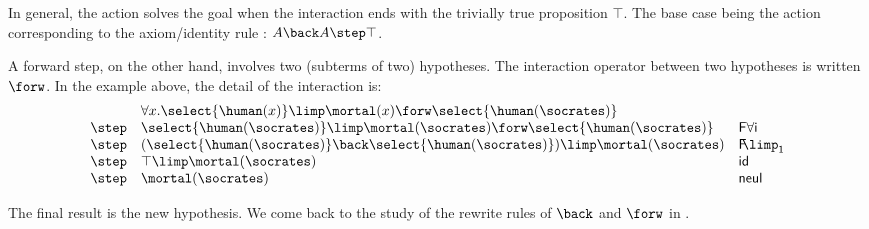 In general, the action solves the goal when the interaction ends with
the trivially true proposition $\top$. The base case being the action
corresponding to the axiom/identity rule : $A\back A \step\top$.

A forward step, on the other hand, involves two (subterms of two)
hypotheses. The interaction operator between two hypotheses is written
$\forw$. In the example above, the detail of the interaction is:
$$
  \begin{array}{lll}
    &  \forall x .\select{\human(x)}\limp\mortal(x) \forw \select{\human(\socrates)}&\\
    \step & \select{\human(\socrates)}\limp\mortal(\socrates) \forw \select{\human(\socrates)}& \mathsf{F \forall i}\\
    \step & (\select{\human(\socrates)}\back \select{\human(\socrates)} )\limp\mortal(\socrates) &\mathsf{F\!\!\limp_1}\\
    \step & \top \limp\mortal(\socrates) &\mathsf{id}\\
    \step & \mortal(\socrates) & \mathsf{neul}\\
  \end{array}
$$

The final result is the new hypothesis. We come back to the study of the rewrite
rules of ${\back}$ and ${\forw}$ in .


